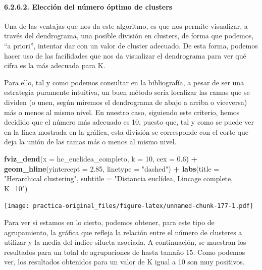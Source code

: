 \documentclass[spanish,]{article}
\newenvironment{Shaded}{\begin{snugshade}}{\end{snugshade}}
\newcommand{\KeywordTok}[1]{\textcolor[rgb]{0.13,0.29,0.53}{\textbf{#1}}}
\newcommand{\DataTypeTok}[1]{\textcolor[rgb]{0.13,0.29,0.53}{#1}}
\newcommand{\DecValTok}[1]{\textcolor[rgb]{0.00,0.00,0.81}{#1}}
\newcommand{\FloatTok}[1]{\textcolor[rgb]{0.00,0.00,0.81}{#1}}
\newcommand{\StringTok}[1]{\textcolor[rgb]{0.31,0.60,0.02}{#1}}
\newcommand{\OperatorTok}[1]{\textcolor[rgb]{0.81,0.36,0.00}{\textbf{#1}}}
\newcommand{\NormalTok}[1]{#1}
\let\oldparagraph\paragraph
\renewcommand{\paragraph}[1]{\oldparagraph{#1}\mbox{}}
\begin{document}
\paragraph{6.2.6.2. Elección del número óptimo de
clusters}\label{eleccion-del-numero-optimo-de-clusters}

Una de las ventajas que nos da este algoritmo, es que nos permite
visualizar, a través del dendrograma, una posible división en clusters,
de forma que podemos, ``a priori'', intentar dar con un valor de cluster
adecuado. De esta forma, podemos hacer uso de las facilidades que nos da
visualizar el dendrograma para ver qué cifra es la más adecuada para K.

Para ello, tal y como podemos consultar en la bibliografía, a pesar de
ser una estrategia puramente intuitiva, un buen método sería localizar
las ramas que se dividen (o unen, según miremos el dendrograma de abajo
a arriba o viceversa) más o menos al mismo nivel. En nuestro caso,
siguiendo este criterio, hemos decidido que el número más adecuado es
10, puesto que, tal y como se puede ver en la línea mostrada en la
gráfica, esta división se corresponde con el corte que deja la unión de
las ramas más o menos al mismo nivel.

\begin{Shaded}
\begin{Highlighting}[]
\KeywordTok{fviz_dend}\NormalTok{(}\DataTypeTok{x =}\NormalTok{ hc_euclidea_completo, }\DataTypeTok{k =} \DecValTok{10}\NormalTok{, }\DataTypeTok{cex =} \FloatTok{0.6}\NormalTok{) }\OperatorTok{+}
\StringTok{  }\KeywordTok{geom_hline}\NormalTok{(}\DataTypeTok{yintercept =} \FloatTok{2.85}\NormalTok{, }\DataTypeTok{linetype =} \StringTok{"dashed"}\NormalTok{) }\OperatorTok{+}
\StringTok{  }\KeywordTok{labs}\NormalTok{(}\DataTypeTok{title =} \StringTok{"Herarchical clustering"}\NormalTok{,}
       \DataTypeTok{subtitle =} \StringTok{"Distancia euclídea, Lincage complete, K=10"}\NormalTok{)}
\end{Highlighting}
\end{Shaded}

\texttt{[image: practica-original\_files/figure-latex/unnamed-chunk-177-1.pdf]}

Para ver si estamos en lo cierto, podemos obtener, para este tipo de
agrupamiento, la gráfica que refleja la relación entre el número de
clusteres a utilizar y la media del índice silueta asociada. A
continuación, se muestran los resultados para un total de agrupaciones
de hasta tamaño 15. Como podemos ver, los resultados obtenidos para un
valor de K igual a 10 son muy positivos.
\end{document}

